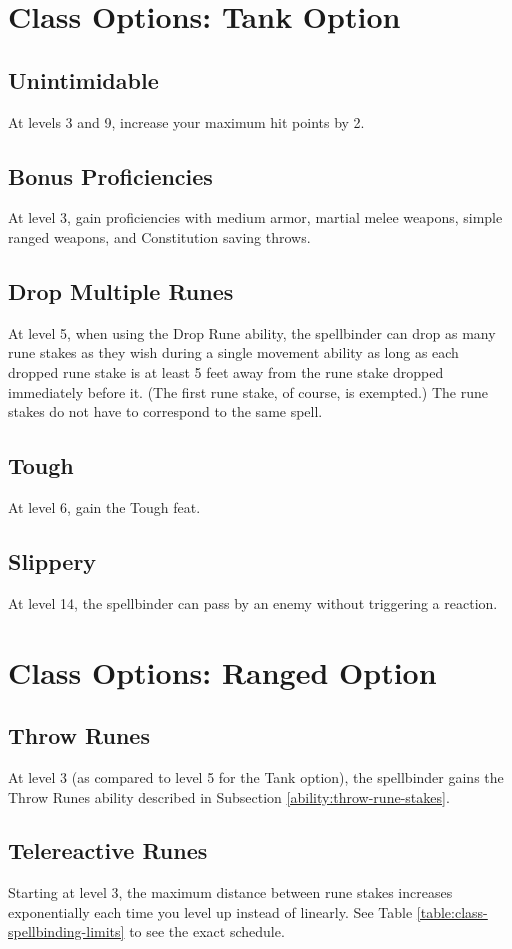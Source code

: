 \section{Class Options: Tank Option}
\subsection{Unintimidable}
At levels 3 and 9, increase your maximum hit points by 2.

\subsection{Bonus Proficiencies}
At level 3, gain proficiencies with medium armor, martial melee weapons, simple ranged weapons, and Constitution saving throws.

\subsection{Drop Multiple Runes}
At level 5, when using the Drop Rune ability, the spellbinder can drop as many rune stakes as they wish during a single movement ability as long as each dropped rune stake is at least 5 feet away from the rune stake dropped immediately before it. (The first rune stake, of course, is exempted.) The rune stakes do not have to correspond to the same spell.

\subsection{Tough}
At level 6, gain the Tough feat.

\subsection{Slippery}
At level 14, the spellbinder can pass by an enemy without triggering a reaction.

\section{Class Options: Ranged Option}
\subsection{Throw Runes}
At level 3 (as compared to level 5 for the Tank option), the spellbinder gains the Throw Runes ability described in Subsection \ref{ability:throw-rune-stakes}.

\subsection{Telereactive Runes}
Starting at level 3, the maximum distance between rune stakes increases exponentially each time you level up instead of linearly. See Table \ref{table:class-spellbinding-limits} to see the exact schedule.

